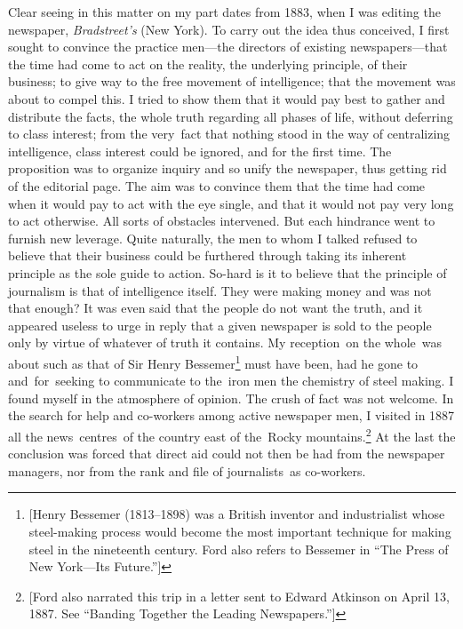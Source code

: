 \documentclass[twoside,symmetric,nobib,justified]{tufte-book}
\begin{document}
Clear seeing in this matter on my part dates from 1883, when I was
editing the newspaper, \emph{Bradstreet's} (New York). To carry out the
idea thus conceived, I first sought to convince the practice men---the
directors of existing newspapers---that the time had come to act on the
reality, the underlying principle, of their business; to give way to the
free movement of intelligence; that the movement was about to compel
this. I tried to show them that it would pay best to gather and
distribute the facts, the whole truth regarding all phases of life,
without deferring to class interest; from the very~fact that nothing
stood in the way of centralizing intelligence, class interest could be
ignored, and for the first time. The proposition was to organize inquiry
and so unify the newspaper, thus getting rid of the editorial page. The
aim was to convince them that the time had come when it would pay to act
with the eye single, and that it would not pay very long to act
otherwise. All sorts of obstacles intervened. But each hindrance went to
furnish new leverage. Quite naturally, the men to whom I talked refused
to believe that their business could be furthered through taking its
inherent principle as the sole guide to action. So-hard is it to believe
that the principle of journalism is that of intelligence itself. They
were making money and was not that enough? It was even said that the
people do not want the truth, and it appeared useless to urge in reply
that a given newspaper is sold to the people only by virtue of whatever
of truth it contains. My reception~on the whole~was about such as that
of Sir Henry Bessemer\footnote{{[}Henry Bessemer (1813--1898) was a
  British inventor and industrialist whose steel-making process would
  become the most important technique for making steel in the nineteenth
  century. Ford also refers to Bessemer in ``The Press of New York---Its
  Future.''{]}} must have been, had he gone to and~for~seeking to
communicate to the~iron men the chemistry of steel making. I found
myself in the atmosphere of opinion. The crush of fact was not welcome.
In the search for help and co-workers among active newspaper men, I
visited in 1887 all the news~centres~of the country east of the~Rocky
mountains.\footnote{{[}Ford also narrated this trip in a letter sent to
  Edward Atkinson on April 13, 1887. See ``Banding Together the Leading
  Newspapers.''{]}} At the last the conclusion was forced that direct
aid could not then be had from the newspaper managers, nor from the rank
and file of journalists~as co-workers.~
\end{document}
